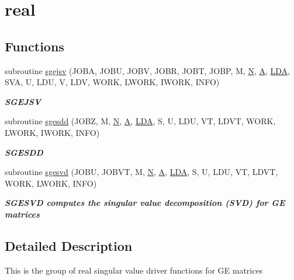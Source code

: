 \hypertarget{group__realGEsing}{}\section{real}
\label{group__realGEsing}
\subsection*{Functions}
\begin{DoxyCompactItemize}
\item 
subroutine \hyperlink{group__realGEsing_ga4b629535d69b782d6421518962e639f1}{sgejsv} (J\+O\+B\+A, J\+O\+B\+U, J\+O\+B\+V, J\+O\+B\+R, J\+O\+B\+T, J\+O\+B\+P, M, \hyperlink{polmisc_8c_a0240ac851181b84ac374872dc5434ee4}{N}, \hyperlink{classA}{A}, \hyperlink{example__user_8c_ae946da542ce0db94dced19b2ecefd1aa}{L\+D\+A}, S\+V\+A, U, L\+D\+U, V, L\+D\+V, W\+O\+R\+K, L\+W\+O\+R\+K, I\+W\+O\+R\+K, I\+N\+F\+O)
\begin{DoxyCompactList}\small\item\em {\bfseries S\+G\+E\+J\+S\+V} \end{DoxyCompactList}\item 
subroutine \hyperlink{group__realGEsing_gac2cd4f1079370ac908186d77efcd5ea8}{sgesdd} (J\+O\+B\+Z, M, \hyperlink{polmisc_8c_a0240ac851181b84ac374872dc5434ee4}{N}, \hyperlink{classA}{A}, \hyperlink{example__user_8c_ae946da542ce0db94dced19b2ecefd1aa}{L\+D\+A}, S, U, L\+D\+U, V\+T, L\+D\+V\+T, W\+O\+R\+K, L\+W\+O\+R\+K, I\+W\+O\+R\+K, I\+N\+F\+O)
\begin{DoxyCompactList}\small\item\em {\bfseries S\+G\+E\+S\+D\+D} \end{DoxyCompactList}\item 
subroutine \hyperlink{group__realGEsing_gaf03d06284b1bfabd3d6c0f6955960533}{sgesvd} (J\+O\+B\+U, J\+O\+B\+V\+T, M, \hyperlink{polmisc_8c_a0240ac851181b84ac374872dc5434ee4}{N}, \hyperlink{classA}{A}, \hyperlink{example__user_8c_ae946da542ce0db94dced19b2ecefd1aa}{L\+D\+A}, S, U, L\+D\+U, V\+T, L\+D\+V\+T, W\+O\+R\+K, L\+W\+O\+R\+K, I\+N\+F\+O)
\begin{DoxyCompactList}\small\item\em {\bfseries  S\+G\+E\+S\+V\+D computes the singular value decomposition (S\+V\+D) for G\+E matrices} \end{DoxyCompactList}\end{DoxyCompactItemize}


\subsection{Detailed Description}
This is the group of real singular value driver functions for G\+E matrices 

